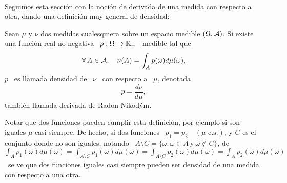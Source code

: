 \

Seguimos esta secci\'on con la noci\'on de derivada de una medida con respecto a
otra, dando una definici\'on muy general de densidad:
%
\begin{definicion}\label{Def:MP:DensidadMedida}
  Sean  $\mu$  y  $\nu$  dos  medidas  cualesquiera  sobre  un  espacio  medible
  $(\Omega,\mathcal{A})$.  Si existe una funci\'on  real no negativa \ $p: \Omega \mapsto
  \mathbb{R}_+$ \ medible tal que
  \[
  \forall \, A \in \mathcal{A}, \quad \nu(A) = \int_A p(\omega) d\mu(\omega),
  \]
  $p$ \ es llamada densidad de \ $\nu$ \ con respecto a \ $\mu$, denotada
  \[
  p = \frac{d\nu}{d\mu},
  \]
  tambi\'en llamada derivada de Radon-Nikod\'ym.
\end{definicion}

Notar   que dos funciones pueden  cumplir esta definici\'on,  por ejemplo si
son  iguales $\mu$-casi siempre.
%
De hecho, si  dos funciones \ $p_1  = p_2 \quad (\mu\mbox{-c.s.})$, y  $C$ es el
conjunto donde no son iguales, notando \  $A \setminus C = \{ \omega: \omega \in
A \:  \mbox{y} \:  \omega \not\in C\}$,  de \ $\displaystyle  \int_A p_1(\omega)
d\mu(\omega) =  \int_{A\setminus C} p_1(\omega)  d\mu(\omega) = \int_{A\setminus
  C} p_2(\omega) d\mu(\omega) = \int_A p_2(\omega) d\mu(\omega)$ \ se ve que dos
funciones iguales casi siempre pueden ser  densidad de una medida con respecto a
una otra.

